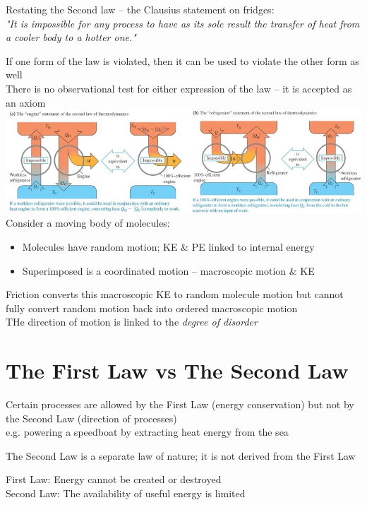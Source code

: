\documentclass[a4paper, 11pt, fleqn, normalem]{report}
\begin{document}
Restating the Second law -- the Clausius statement on fridges: \\
\emph{"It is impossible for any process to have as its sole result the transfer of heat from a cooler body to a hotter one."}

If one form of the law is violated, then it can be used to violate the other form as well \\
There is no observational test for either expression of the law -- it is accepted as an axiom \\
\includegraphics[scale=0.69]{Impossible.jpg} \\
Consider a moving body of molecules:
\begin{itemize}
	\item[] Molecules have random motion; KE \& PE linked to internal energy
	\item[] Superimposed is a coordinated motion -- macroscopic motion \& KE
\end{itemize}
Friction converts this macroscopic KE to random molecule motion but cannot fully convert random motion back into ordered macroscopic motion \\
THe direction of motion is linked to the \emph{degree of disorder}

\section{The First Law vs The Second Law}
Certain processes are allowed by the First Law (energy conservation) but not by the Second Law (direction of processes) \\
e.g. powering a speedboat by extracting heat energy from the sea

The Second Law is a separate law of nature; it is not derived from the First Law

First Law: Energy cannot be created or destroyed \\
Second Law: The availability of useful energy is limited
\end{document}
